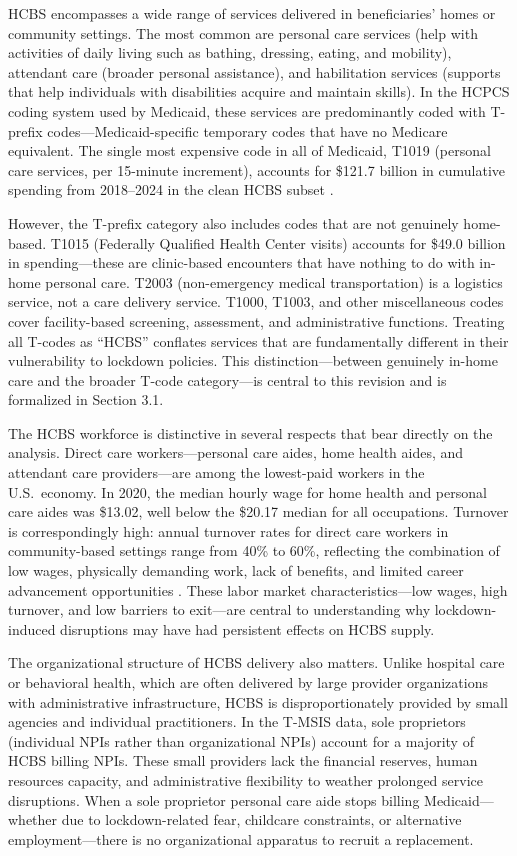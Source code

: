 \documentclass[12pt]{article}
\begin{document}
HCBS encompasses a wide range of services delivered in beneficiaries' homes or community settings. The most common are personal care services (help with activities of daily living such as bathing, dressing, eating, and mobility), attendant care (broader personal assistance), and habilitation services (supports that help individuals with disabilities acquire and maintain skills). In the HCPCS coding system used by Medicaid, these services are predominantly coded with T-prefix codes---Medicaid-specific temporary codes that have no Medicare equivalent. The single most expensive code in all of Medicaid, T1019 (personal care services, per 15-minute increment), accounts for \$121.7 billion in cumulative spending from 2018--2024 in the clean HCBS subset \citep{hhs2026tmsis}.

However, the T-prefix category also includes codes that are not genuinely home-based. T1015 (Federally Qualified Health Center visits) accounts for \$49.0 billion in spending---these are clinic-based encounters that have nothing to do with in-home personal care. T2003 (non-emergency medical transportation) is a logistics service, not a care delivery service. T1000, T1003, and other miscellaneous codes cover facility-based screening, assessment, and administrative functions. Treating all T-codes as ``HCBS'' conflates services that are fundamentally different in their vulnerability to lockdown policies. This distinction---between genuinely in-home care and the broader T-code category---is central to this revision and is formalized in Section 3.1.

The HCBS workforce is distinctive in several respects that bear directly on the analysis. Direct care workers---personal care aides, home health aides, and attendant care providers---are among the lowest-paid workers in the U.S.\ economy. In 2020, the median hourly wage for home health and personal care aides was \$13.02, well below the \$20.17 median for all occupations. Turnover is correspondingly high: annual turnover rates for direct care workers in community-based settings range from 40\% to 60\%, reflecting the combination of low wages, physically demanding work, lack of benefits, and limited career advancement opportunities \citep{scales2020, phiinc2021}. These labor market characteristics---low wages, high turnover, and low barriers to exit---are central to understanding why lockdown-induced disruptions may have had persistent effects on HCBS supply.

The organizational structure of HCBS delivery also matters. Unlike hospital care or behavioral health, which are often delivered by large provider organizations with administrative infrastructure, HCBS is disproportionately provided by small agencies and individual practitioners. In the T-MSIS data, sole proprietors (individual NPIs rather than organizational NPIs) account for a majority of HCBS billing NPIs. These small providers lack the financial reserves, human resources capacity, and administrative flexibility to weather prolonged service disruptions. When a sole proprietor personal care aide stops billing Medicaid---whether due to lockdown-related fear, childcare constraints, or alternative employment---there is no organizational apparatus to recruit a replacement.
\end{document}
